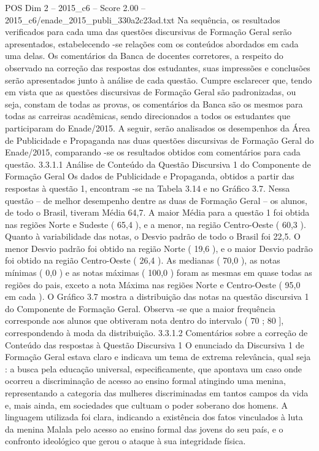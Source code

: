 \begin{textsample}{POS Dim 2 – 2015\_c6 – Score 2.00 – 2015\_c6/enade\_2015\_publi\_330a2c23ad.txt}
Na sequência, os resultados verificados para cada uma das questões discursivas de Formação Geral serão apresentados, estabelecendo -se relações com os conteúdos abordados em cada uma delas.
Os comentários da Banca de docentes corretores, a respeito do observado na correção das respostas dos estudantes, suas impressões e conclusões serão apresentados junto à análise de cada questão.
Cumpre esclarecer que, tendo em vista que as questões discursivas de Formação Geral são padronizadas, ou seja, constam de todas as provas, os comentários da Banca são os mesmos para todas as carreiras acadêmicas, sendo direcionados a todos os estudantes que participaram do Enade/2015.
A seguir, serão analisados os desempenhos da Área de Publicidade e Propaganda nas duas questões discursivas de Formação Geral do Enade/2015, comparando -se os resultados obtidos com comentários para cada questão. 3.3.1.1 Análise de Conteúdo da Questão Discursiva 1 do Componente de Formação Geral Os dados de Publicidade e Propaganda, obtidos a partir das respostas à questão 1, encontram -se na Tabela 3.14 e no Gráfico 3.7.
Nessa questão – de melhor desempenho dentre as duas de Formação Geral – os alunos, de todo o Brasil, tiveram Média 64,7.
A maior Média para a questão 1 foi obtida nas regiões Norte e Sudeste ( 65,4 ), e a menor, na região Centro-Oeste ( 60,3 ).
Quanto à variabilidade das notas, o Desvio padrão de todo o Brasil foi 22,5.
O menor Desvio padrão foi obtido na região Norte ( 19,6 ), e o maior Desvio padrão foi obtido na região Centro-Oeste ( 26,4 ).
As medianas ( 70,0 ), as notas mínimas ( 0,0 ) e as notas máximas ( 100,0 ) foram as mesmas em quase todas as regiões do pais, exceto a nota Máxima nas regiões Norte e Centro-Oeste ( 95,0 em cada ).
O Gráfico 3.7 mostra a distribuição das notas na questão discursiva 1 do Componente de Formação Geral.
Observa -se que a maior frequência corresponde aos alunos que obtiveram nota dentro do intervalo ( 70 ; 80 ], correspondendo à moda da distribuição. 3.3.1.2 Comentários sobre a correção de Conteúdo das respostas à Questão Discursiva 1 O enunciado da Discursiva 1 de Formação Geral estava claro e indicava um tema de extrema relevância, qual seja : a busca pela educação universal, especificamente, que apontava um caso onde ocorreu a discriminação de acesso ao ensino formal atingindo uma menina, representando a categoria das mulheres discriminadas em tantos campos da vida e, mais ainda, em sociedades que cultuam o poder soberano dos homens.
A linguagem utilizada foi clara, indicando a existência dos fatos vinculados à luta da menina Malala pelo acesso ao ensino formal das jovens do seu país, e o confronto ideológico que gerou o ataque à sua integridade física.

\end{textsample}
